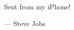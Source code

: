 
\clearforchapter
\thispagestyle{empty}

\begin{center}
  \vspace*{100pt}
  \let\oldepigraphwidth\epigraphwidth
  \setlength{\epigraphwidth}{4.9cm}
  \epigraph{
    \normalsize
     Sent from my iPhone!
  }%
  {\textup{--- Steve Jobs}}
  \let\epigraphwidth\oldepigraphwidth
\end{center}

\cleardoublepage

